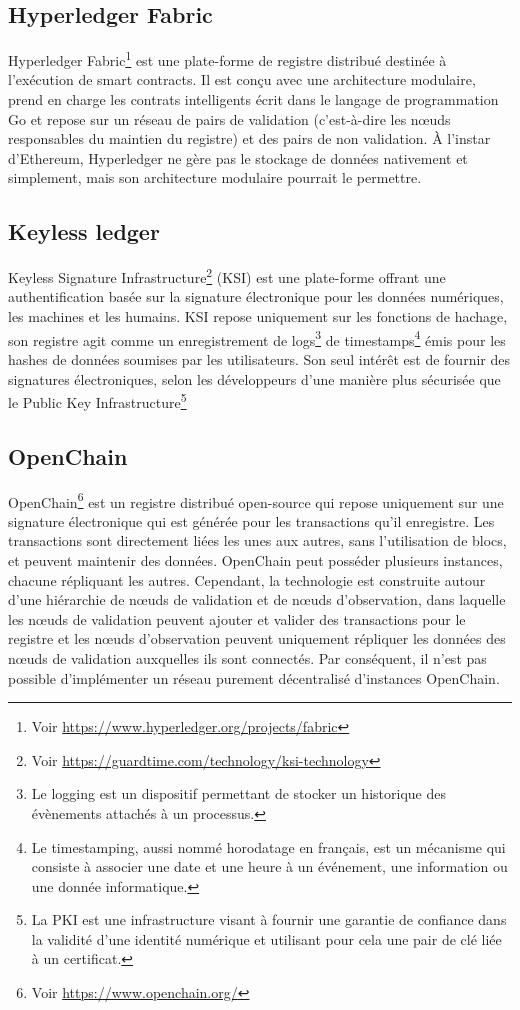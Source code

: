 \documentclass{tnreport}
\begin{document}
\subsection{Hyperledger Fabric}

Hyperledger Fabric\footnote{Voir \url{https://www.hyperledger.org/projects/fabric}} est une plate-forme de registre distribué destinée à l'exécution de smart contracts. Il est conçu avec une architecture modulaire, prend en charge les contrats intelligents écrit dans le langage de programmation Go et repose sur un réseau de pairs de validation (c'est-à-dire les nœuds responsables du maintien du registre) et des pairs de non validation. À l'instar d'Ethereum, Hyperledger ne gère pas le stockage de données nativement et simplement, mais son architecture modulaire pourrait le permettre.

\subsection{Keyless ledger}

Keyless Signature Infrastructure\footnote{Voir \url{https://guardtime.com/technology/ksi-technology}} (KSI) est une plate-forme offrant une authentification basée sur la signature électronique pour les données numériques, les machines et les humains. KSI repose uniquement sur les fonctions de hachage, son registre agit comme un enregistrement de logs\footnote{Le logging est un dispositif permettant de stocker un historique des évènements attachés à un processus.} de timestamps\footnote{Le timestamping, aussi nommé horodatage en français, est un mécanisme qui consiste à associer une date et une heure à un événement, une information ou une donnée informatique.} émis pour les hashes de données soumises par les utilisateurs. Son seul intérêt est de fournir des signatures électroniques, selon les développeurs d'une manière plus sécurisée que le Public Key Infrastructure\footnote{La PKI est une infrastructure visant à fournir une garantie de confiance dans la validité d’une identité numérique et utilisant pour cela une pair de clé liée à un certificat.}

\subsection{OpenChain}

OpenChain\footnote{Voir \url{https://www.openchain.org/}} est un registre distribué open-source qui repose uniquement sur une signature électronique qui est générée pour les transactions qu'il enregistre. Les transactions sont directement liées les unes aux autres, sans l'utilisation de blocs, et peuvent maintenir des données. OpenChain peut posséder plusieurs instances, chacune répliquant les autres. Cependant, la technologie est construite autour d'une hiérarchie de nœuds de validation et de nœuds d'observation, dans laquelle les nœuds de validation peuvent ajouter et valider des transactions pour le registre et les nœuds d'observation peuvent uniquement répliquer les données des nœuds de validation auxquelles ils sont connectés. Par conséquent, il n'est pas possible d'implémenter un réseau purement décentralisé d'instances OpenChain.
\end{document}
